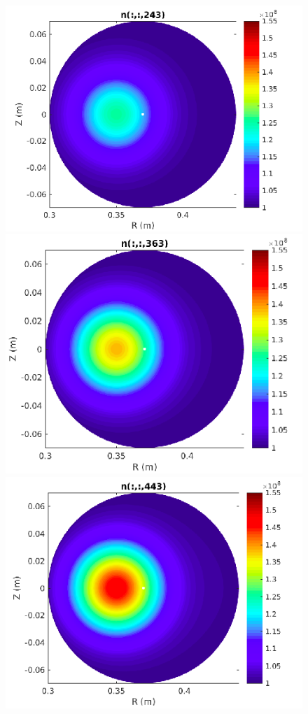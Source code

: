 \documentclass[12pt,oneside,a4paper]{abntex2}
\begin{document}
\begin{figure}[H]
\includegraphics[scale=0.4]{../SImulacao_breakdown/Adaptacao_nova/explicito/n243.png} 
\includegraphics[scale=0.4]{../SImulacao_breakdown/Adaptacao_nova/explicito/n363.png} 
\includegraphics[scale=0.4]{../SImulacao_breakdown/Adaptacao_nova/explicito/n443.png} 

\end{figure}
\end{document}
